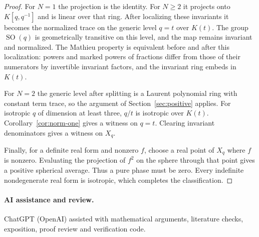 \documentclass[11pt]{article}
\DeclareMathOperator{\SO}{SO}
\begin{document}
\begin{proof}
For \(N=1\) the projection is the identity. For \(N\ge2\) it
projects onto \(K[q,q^{-1}]\) and is linear over that ring.
After localizing these invariants it becomes the normalized trace
on the generic level \(q=t\) over \(K(t)\). The group \(\SO(q)\) is
geometrically transitive on this level, and the map remains
invariant and normalized.
The Mathieu property is equivalent before and after this localization:
powers and marked powers of fractions differ from those of their
numerators by invertible invariant factors, and the invariant ring
embeds in \(K(t)\).

For \(N=2\) the generic level after splitting is a Laurent polynomial ring with constant
term trace, so the argument of Section~\ref{sec:positive} applies.
For isotropic \(q\) of dimension at least three, \(q/t\) is isotropic
over \(K(t)\). Corollary~\ref{cor:norm-one} gives a witness on \(q=t\).
Clearing invariant denominators gives a witness on \(X_q\).

Finally, for a definite real form and nonzero \(f\), choose a real
point of \(X_q\) where \(f\) is nonzero. Evaluating the projection of
\(f^2\) on the sphere through that point gives a positive spherical
average. Thus a pure phase must be zero. Every indefinite
nondegenerate real form is isotropic, which completes the classification.
\end{proof}

\paragraph{AI assistance and review.}
ChatGPT (OpenAI) assisted with mathematical arguments, literature checks,
exposition, proof review and verification code.
\end{document}
